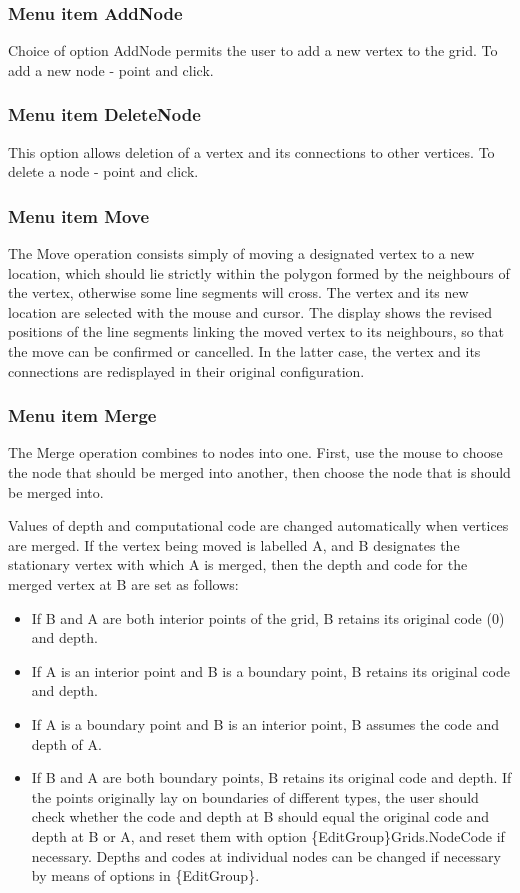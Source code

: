 \documentclass{article}
\begin{document}
\subsubsection[Menu item AddNode]{Menu item AddNode}
Choice of option AddNode permits the user to add a new vertex to the grid. To add a new node - point and click.


\subsubsection[Menu item DeleteNode]{Menu item DeleteNode}
This option allows deletion of a vertex and its connections to other vertices. To delete a node - point and click.

\subsubsection[Menu item Move]{Menu item Move}
The Move operation consists simply of moving a designated vertex to a new location, which should lie strictly within the polygon formed by the neighbours of the vertex, otherwise some line segments will cross. The vertex and its new location are selected with the mouse and cursor. The display shows the revised positions of the line segments linking the moved vertex to its neighbours, so that the move can be confirmed or cancelled. In the latter case, the vertex and its connections are redisplayed in their original configuration. 

\subsubsection[Menu item Merge]{Menu item Merge}

The Merge operation combines to nodes into one. First, use the mouse to choose the node that should be merged into another, then choose the node that is should be merged into. 

Values of depth and computational code are changed automatically when vertices are merged. If the vertex being moved is labelled A, and B designates the stationary vertex with which A is merged, then the depth and code for the merged vertex at B are set as follows:

\begin{itemize}
\item If B and A are both interior points of the grid, B retains its original code (0) and depth.
\item If A is an interior point and B is a boundary point, B retains its original code and depth.
\item If A is a boundary point and B is an interior point, B assumes the code and depth of A.
\item If B and A are both boundary points, B retains its original code and depth. If the points originally lay on boundaries of different types, the user should check whether the code and depth at B should equal the original code and depth at B or A, and reset them with option \{EditGroup\}Grids.NodeCode if necessary. Depths and codes at individual nodes can be changed if necessary by means of options in \{EditGroup\}.
\end{itemize}
\end{document}
